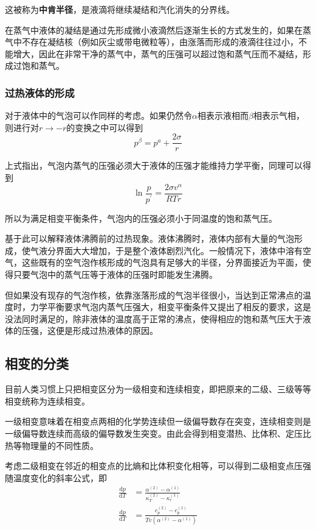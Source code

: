 \documentclass[UTF8]{ctexart}
\newcommand{\dif}{\mathrm{d}}
\begin{document}
\noindent 这被称为\textbf{中肯半径}，是液滴将继续凝结和汽化消失的分界线。

	在蒸气中液体的凝结是通过先形成微小液滴然后逐渐生长的方式发生的，如果在蒸气中不存在凝结核（例如灰尘或带电微粒等），由涨落而形成的液滴往往过小，不能增大，因此在非常干净的蒸气中，蒸气的压强可以超过饱和蒸气压而不凝结，形成过饱和蒸气。
	
	\subsubsection{过热液体的形成}
	对于液体中的气泡可以作同样的考虑。如果仍然令$ \alpha $相表示液相而$ \beta $相表示气相，则进行对$ r \rightarrow  -r $的变换之中可以得到
	\begin{equation}
	p^{\beta}=p^{a}+\frac{2 \sigma}{r}
	\end{equation}
	
\noindent 上式指出，气泡内蒸气的压强必须大于液体的压强才能维持力学平衡，同理可以得到
\begin{equation}
\ln \frac{p}{p^{\prime}}=\frac{2 \sigma v^{\alpha}}{R T r}
\end{equation}

\noindent 所以为满足相变平衡条件，气泡内的压强必须小于同温度的饱和蒸气压。

	基于此可以解释液体沸腾前的过热现象。液体沸腾时，液体内部有大量的气泡形成，使气液分界面大大增加，于是整个液体剧烈汽化。一般情况下，液体中溶有空气，这些既有的空气泡作核形成的气泡具有足够大的半径，分界面接近为平面，使得只要气泡中的蒸气压等于液体的压强时即能发生沸腾。
	
	但如果没有现存的气泡作核，依靠涨落形成的气泡半径很小，当达到正常沸点的温度时，力学平衡要求气泡内蒸气压强大，相变平衡条件又提出了相反的要求，这是没法同时满足的，除非液体的温度高于正常的沸点，使得相应的饱和蒸气压大于液体的压强，这便是形成过热液体的原因。
	
	\subsection{相变的分类}
	目前人类习惯上只把相变区分为一级相变和连续相变，即把原来的二级、三级等等相变统称为连续相变。
	
	一级相变意味着在相变点两相的化学势连续但一级偏导数存在突变，连续相变则是一级偏导数连续而高级的偏导数发生突变。由此会得到相变潜热、比体积、定压比热等物理量的不同性质。
	
	考虑二级相变在邻近的相变点的比熵和比体积变化相等，可以得到二级相变点压强随温度变化的斜率公式，即
	\begin{equation}
	\begin{aligned}\frac{\dif p}{\dif T}&=\frac{\alpha^{(2)}-\alpha^{(1)}}{\kappa_{T}^{(2)}-\kappa_{r}^{(1)}} 
		\\ 
	\frac{\dif p}{\dif T}&=\frac{c_{p}^{(2)}-c_{p}^{(1)}}{T v\left(\alpha^{(2)}-\alpha^{(1)}\right)}\end{aligned}
	\end{equation}
	
\end{document}

